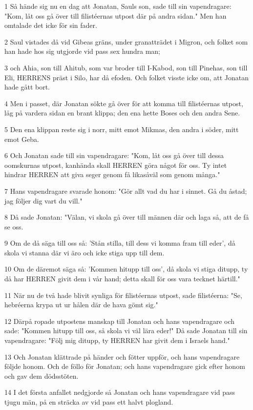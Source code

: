 \par 1 Så hände sig nu en dag att Jonatan, Sauls son, sade till sin vapendragare: "Kom, låt oss gå över till filistéernas utpost där på andra sidan." Men han omtalade det icke för sin fader.
\par 2 Saul vistades då vid Gibeas gräns, under granatträdet i Migron, och folket som han hade hos sig utgjorde vid pass sex hundra man;
\par 3 och Ahia, son till Ahitub, som var broder till I-Kabod, son till Pinehas, son till Eli, HERRENS präst i Silo, har då efoden. Och folket visste icke om, att Jonatan hade gått bort.
\par 4 Men i passet, där Jonatan sökte gå över för att komma till filistéernas utpost, låg på vardera sidan en brant klippa; den ena hette Boses och den andra Sene.
\par 5 Den ena klippan reste sig i norr, mitt emot Mikmas, den andra i söder, mitt emot Geba.
\par 6 Och Jonatan sade till sin vapendragare: "Kom, låt oss gå över till dessa oomskurnas utpost, kanhända skall HERREN göra något för oss. Ty intet hindrar HERREN att giva seger genom få likasåväl som genom många."
\par 7 Hans vapendragare svarade honom: "Gör allt vad du har i sinnet. Gå du åstad; jag följer dig vart du vill."
\par 8 Då sade Jonatan: "Välan, vi skola gå över till männen där och laga så, att de få se oss.
\par 9 Om de då säga till oss så: 'Stån stilla, till dess vi komma fram till eder', då skola vi stanna där vi äro och icke stiga upp till dem.
\par 10 Om de däremot säga så: 'Kommen hitupp till oss', då skola vi stiga ditupp, ty då har HERREN givit dem i vår hand; detta skall för oss vara tecknet härtill."
\par 11 När nu de två hade blivit synliga för filistéernas utpost, sade filistéerna: "Se, hebréerna krypa ut ur hålen där de hava gömt sig."
\par 12 Därpå ropade utpostens manskap till Jonatan och hans vapendragare och sade: "Kommen hitupp till oss, så skola vi väl lära eder!" Då sade Jonatan till sin vapendragare: "Följ mig ditupp, ty HERREN har givit dem i Israels hand."
\par 13 Och Jonatan klättrade på händer och fötter uppför, och hans vapendragare följde honom. Och de föllo för Jonatan; och hans vapendragare gick efter honom och gav dem dödsstöten.
\par 14 I det första anfallet nedgjorde så Jonatan och hans vapendragare vid pass tjugu män, på en sträcka av vid pass ett halvt plogland.
